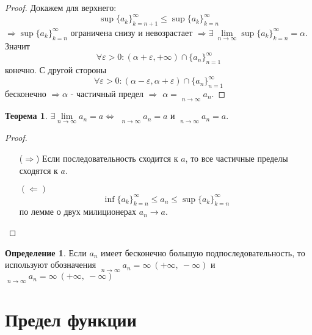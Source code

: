 \documentclass[a4paper, 12pt]{article}
\renewcommand{\epsilon}{\varepsilon}
\newcommand\tab[1][.5cm]{\hspace*{#1}}
\newcommand{\lims}{\lim\limits_{n\to \infty}}
\DeclareMathOperator*\lowlim{\underline{lim}}
\DeclareMathOperator*\uplim{\overline{lim}}
\theoremstyle{definition}
\newtheorem*{definition}{Определение}
\newtheorem*{theorem}{Теорема}
\begin{document}
        \begin{proof}
            Докажем для верхнего: 
            \[\sup \{a_k\}_{k=n+1}^{\infty} \leq \sup \{a_k\}_{k=n}^{\infty}\] 
            $\Rightarrow \sup\{a_k\}_{k=n}^{\infty}$ ограничена снизу и невозрастает $\Rightarrow \exists\ \lims \sup\{a_k\}_{k=n}^{\infty}=\alpha$. Значит 
            \[\forall \epsilon>0: (\alpha+\epsilon,+\infty)\cap \{a_n\}_{n=1}^{\infty}\]
            конечно. С другой стороны 
            \[\forall \epsilon>0: (\alpha-\epsilon, \alpha+\epsilon)\cap \{a_n\}_{n=1}^{\infty}\] 
            бесконечно
            $\Rightarrow \alpha$ - частичный предел $\Rightarrow$ $\alpha=\uplim\limits_{n\to \infty}a_n$.
        \end{proof} 
        \begin{theorem}
            $\exists \lims a_n=a \Leftrightarrow$ $\uplim\limits_{n\to \infty}a_n=a$ и $\lowlim\limits_{n\to \infty}a_n=a$.
        \end{theorem} 
        \begin{proof}\tab
            \begin{itemize}
                \item[($\Rightarrow$)] Если последовательность сходится к $a$, то все частичные пределы сходятся к $a$.
                \item[$(\Leftarrow)$] \[\inf \{a_k\}_{k=n}^{\infty}\leq a_n\leq \sup \{a_k\}_{k=n}^{\infty}\] по лемме о двух милиционерах $a_n \to a$. 
            \end{itemize}
        \end{proof} 
        \begin{definition}
            Если $a_n$ имеет бесконечно большую подпоследовательность, то используют обозначения $\uplim\limits_{n\to \infty}a_n=\infty\ (+\infty,\ -\infty)$ и $\lowlim\limits_{n\to \infty}a_n=\infty\ (+\infty,\ -\infty)$
        \end{definition}
    \section{Предел функции}
\end{document}
